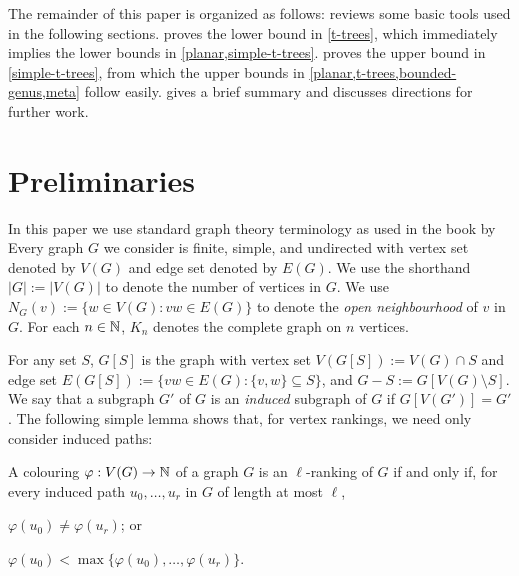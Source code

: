 \documentclass[kpfonts]{patmorin}
\theoremstyle{named}
\begin{document}
The remainder of this paper is organized as follows:  reviews some basic tools used in the following sections.    proves the lower bound in \cref{t-trees}, which immediately implies the lower bounds in \cref{planar,simple-t-trees}.  proves the upper bound in \cref{simple-t-trees}, from which the upper bounds in \cref{planar,t-trees,bounded-genus,meta} follow easily.   gives a brief summary and discusses directions for further work.

\section{Preliminaries}

In this paper we use standard graph theory terminology as used in the book by \citet{diestel:graph}
Every graph $G$ we consider is finite, simple, and undirected with vertex set denoted by $V(G)$ and edge set denoted by $E(G)$.  We use the shorthand $|G|:=|V(G)|$ to denote the number of vertices in $G$.  We use $N_G(v):=\{w\in V(G): vw\in E(G)\}$ to denote the \emph{open neighbourhood} of $v$ in $G$.  For each $n\in\mathbb{N}$, $K_n$ denotes the complete graph on $n$ vertices.

For any set $S$, $G[S]$ is the graph with vertex set $V(G[S]):=V(G)\cap S$ and edge set $E(G[S]):=\{vw\in E(G): \{v,w\}\subseteq S\}$, and $G-S:=G[V(G)\setminus S]$.  We say that a subgraph $G'$ of $G$ is an \emph{induced} subgraph of $G$ if $G[V(G')]=G'$.  The following simple lemma shows that, for vertex rankings, we need only consider induced paths:

\begin{obs}\label{induced-paths-only}
    A colouring $\varphi:V(G)\to\mathbb{N}$ of a graph $G$ is an $\ell$-ranking of $G$ if and only if, for every induced path $u_0,\ldots,u_r$ in $G$ of length at most $\ell$,
    \begin{inparaenum}[(i)]
        \item $\varphi(u_0)\neq\varphi(u_r)$; or
        \item $\varphi(u_0)<\max\{\varphi(u_0),\ldots,\varphi(u_r)\}$.
    \end{inparaenum}
\end{obs}
\end{document}
